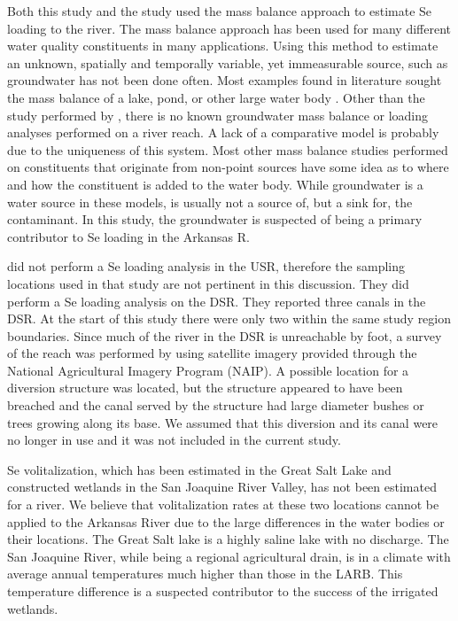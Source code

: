 Both this study and the \citeauthor{Mueller2008} study used the mass balance approach to estimate Se loading to the river.  The mass balance approach has been used for many different water quality constituents in many applications.  Using this method to estimate an unknown, spatially and temporally variable, yet immeasurable source, such as groundwater has not been done often.  Most examples found in literature sought the mass balance of a lake, pond, or other large water body \citep{Gersberg2006, Takayanagi1984}. Other than the study performed by \citeauthor{Mueller2008}, there is no known groundwater mass balance or loading analyses performed on a river reach.  A lack of a comparative model is probably due to the uniqueness of this system.  Most other mass balance studies performed on constituents that originate from non-point sources have some idea as to where and how the constituent is added to the water body.  While groundwater is a water source in these models, is usually not a source of, but a sink for, the contaminant.  In this study, the groundwater is suspected of being a primary contributor to Se loading in the Arkansas R.

\citeauthor{Mueller2008} did not perform a Se loading analysis in the USR, therefore the sampling locations used in that study are not pertinent in this discussion.  They did perform a Se loading analysis on the DSR.  They reported three canals in the DSR.  At the start of this study there were only two within the same study region boundaries.  Since much of the river in the DSR is unreachable by foot, a survey of the reach was performed by using satellite imagery provided through the National Agricultural Imagery Program (NAIP).  A possible location for a diversion structure was located, but the structure appeared to have been breached and the canal served by the structure had large diameter bushes or trees growing along its base.  We assumed that this diversion and its canal were no longer in use and it was not included in the current study.

Se volitalization, which has been estimated in the Great Salt Lake and constructed wetlands in the San Joaquine River Valley, has not been estimated for a river.  We believe that volitalization rates at these two locations cannot be applied to the Arkansas River due to the large differences in the water bodies or their locations.  The Great Salt lake is a highly saline lake with no discharge.  The San Joaquine River, while being a regional agricultural drain, is in a climate with average annual temperatures much higher than those in the LARB.  This temperature difference is a suspected contributor to the success of the irrigated wetlands.


